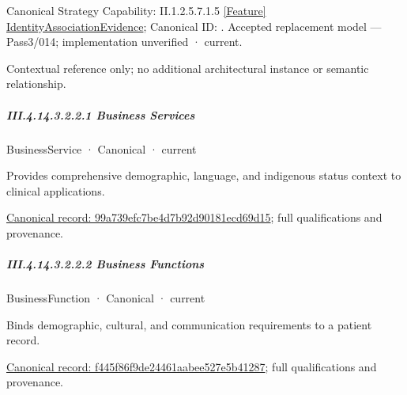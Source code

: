 {\small Canonical Strategy Capability: II.1.2.5.7.1.5 \hyperref[element:4389056525db482a8463e1f79bda5266]{[Feature] IdentityAssociationEvidence}; Canonical ID: \texttt{}. Accepted replacement model — Pass3/014; implementation unverified · current.}\par
Contextual reference only; no additional architectural instance or semantic relationship.\par
\subparagraph*{III.4.14.3.2.2.1 Business Services}
\label{navigation:III.4.14.3.2.2.1}

\label{navigation:III.4.14.3.2.2.1.1}

\label{element:99a739efc7be4d7b92d90181ecd69d15}
{\small BusinessService · Canonical · current}\par

Provides comprehensive demographic, language, and indigenous status context to clinical applications.


{\footnotesize \href{../../../../../../../../continuum/business/business-service/99a739efc7be4d7b92d90181ecd69d15.md}{Canonical record: 99a739efc7be4d7b92d90181ecd69d15}; full qualifications and provenance.}\par
\subparagraph*{III.4.14.3.2.2.2 Business Functions}
\label{navigation:III.4.14.3.2.2.2}

\label{navigation:III.4.14.3.2.2.2.1}

\label{element:f445f86f9de24461aabee527e5b41287}
{\small BusinessFunction · Canonical · current}\par

Binds demographic, cultural, and communication requirements to a patient record.


{\footnotesize \href{../../../../../../../../continuum/business/business-function/f445f86f9de24461aabee527e5b41287.md}{Canonical record: f445f86f9de24461aabee527e5b41287}; full qualifications and provenance.}\par
